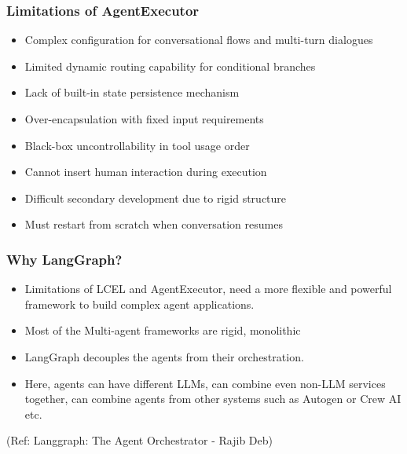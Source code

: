 \begin{frame}[fragile]\frametitle{Limitations of AgentExecutor}
      \begin{itemize}
        \item Complex configuration for conversational flows and multi-turn dialogues
        \item Limited dynamic routing capability for conditional branches
        \item Lack of built-in state persistence mechanism
        \item Over-encapsulation with fixed input requirements
        \item Black-box uncontrollability in tool usage order
        \item Cannot insert human interaction during execution
        \item Difficult secondary development due to rigid structure
        \item Must restart from scratch when conversation resumes
      \end{itemize}
\end{frame}


\begin{frame}[fragile]\frametitle{Why LangGraph?}

\begin{itemize}
\item Limitations of LCEL and AgentExecutor, need a more flexible and powerful framework to build complex agent applications.
\item Most of the Multi-agent frameworks are rigid, monolithic
\item LangGraph decouples the agents from their orchestration.
\item Here, agents can have different LLMs, can combine even non-LLM services together, can combine agents from other systems such as Autogen or Crew AI etc.
\end{itemize}


{\tiny (Ref: Langgraph: The Agent Orchestrator - Rajib Deb)}


\end{frame}


